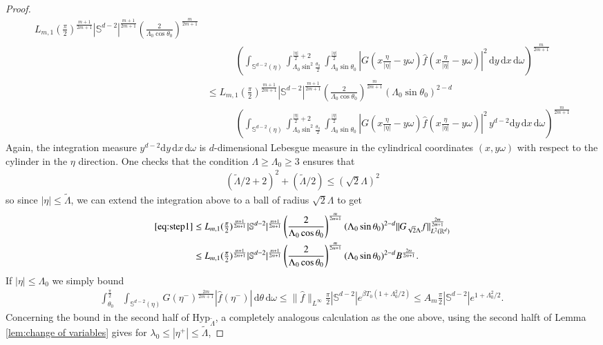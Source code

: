 \documentclass[11pt,a4paper,reqno]{amsart}
\theoremstyle{plain}
\theoremstyle{definition}
\begin{document}
\begin{proof}
\begin{align*}
		L_{m,1} (\tfrac{\pi}{2})^{\frac{m+1}{2m+1}} |{\mathbb{S}}^{d-2}|^{\frac{m+1}{2m+1}}
		\left(\frac{2}{\Lambda_0\cos\theta_0} \right)^{\frac{m}{2m+1}} \\
		 &\qquad\quad
		\left( \int_{{\mathbb{S}}^{d-2}(\eta)} \int_{\Lambda_0\sin^2\tfrac{\theta_0}{2}}^{\tfrac{|\eta|}{2}+2}
		\int_{\Lambda_0\sin\theta_0}^{\tfrac{|\eta|}{2}}
			| G(x\tfrac{\eta}{|\eta|}-y\omega)\hat{f}(x\tfrac{\eta}{|\eta|}-y\omega)|^2\,
		 \mathrm{d}y \, \mathrm{d}x\, \mathrm{d}\omega \right)^{\frac{m}{2m+1}} \\
		 & \le
		L_{m,1} (\tfrac{\pi}{2})^{\frac{m+1}{2m+1}} |{\mathbb{S}}^{d-2}|^{\frac{m+1}{2m+1}}
		\left(\frac{2}{\Lambda_0\cos\theta_0} \right)^{\frac{m}{2m+1}}
		(\Lambda_0\sin\theta_0)^{2-d} \\
		 &\qquad\quad
		\left( \int_{{\mathbb{S}}^{d-2}(\eta)} \int_{\Lambda_0\sin^2\tfrac{\theta_0}{2}}^{\tfrac{|\eta|}{2}+2}
		\int_{\Lambda_0\sin\theta_0}^{\tfrac{|\eta|}{2}}
			| G(x\tfrac{\eta}{|\eta|}-y\omega)\hat{f}(x\tfrac{\eta}{|\eta|}-y\omega)|^2
			\, y^{d-2}\mathrm{d}y\, \mathrm{d}x\, \mathrm{d}\omega \right)^{\frac{m}{2m+1}}
	\end{align*}
	Again, the integration measure $ y^{d-2}\mathrm{d}y\, \mathrm{d}x\, \mathrm{d}\omega$ is $d$-dimensional Lebesgue measure in the cylindrical coordinates  $(x,y\omega)$ with respect to the cylinder in the $\eta$ direction. One checks that the condition $\Lambda\ge\Lambda_0\ge 3$ ensures that
	\begin{align*}
		(\widetilde{\Lambda}/2+2)^2 +(\widetilde{\Lambda}/2) \le (\sqrt{2}\Lambda)^2
	\end{align*}
	so since $|\eta|\leq \widetilde{\Lambda}$, we can extend the integration above to a ball of radius $\sqrt{2}\Lambda$ to get
	\begin{align}
		\eqref{eq:step1}
		&\le
		L_{m,1} (\tfrac{\pi}{2})^{\frac{m+1}{2m+1}} |{\mathbb{S}}^{d-2}|^{\frac{m+1}{2m+1}}
		\left(\frac{2}{\Lambda_0\cos\theta_0} \right)^{\frac{m}{2m+1}}
		(\Lambda_0\sin\theta_0)^{2-d}
			\| G_{\sqrt{2}\Lambda}f \|_{L^2({\mathbb{R}}^d)}^{\frac{2m}{2m+1}} \nonumber\\
		&\le
			 L_{m,1} (\tfrac{\pi}{2})^{\frac{m+1}{2m+1}} |{\mathbb{S}}^{d-2}|^{\frac{m+1}{2m+1}}
		\left(\frac{2}{\Lambda_0\cos\theta_0} \right)^{\frac{m}{2m+1}}
		(\Lambda_0\sin\theta_0)^{2-d} B^{\frac{2m}{2m+1}} .
			\label{eq:step2}
	\end{align}
 If $|\eta|\le \Lambda_0$ we simply bound
 \begin{align}\label{eq:step3}
 	\int_{\theta_0}^{\tfrac{\pi}{2}} &\int_{{\mathbb{S}}^{d-2}(\eta)}  G(\eta^-)^{\frac{2m}{2m+1}} |\hat{f}(\eta^-)| \, \mathrm{d}\theta\, \mathrm{d}\omega
 	\le \|\hat{f}\|_{L^\infty} \frac{\pi}{2} |{\mathbb{S}}^{d-2}| e^{\beta T_0(1+\Lambda_0^2/2)}
 	\le A_m \frac{\pi}{2}|{\mathbb{S}}^{d-2}| e^{1+\Lambda_0^2/2}.
 \end{align}
 Concerning the bound in the second half of $\mathrm{Hyp}_{\widetilde{\Lambda}}$, a completely analogous calculation as the one above, using the second halft of Lemma \ref{lem:change of variables} gives for $\lambda_0\le |\eta^+|\le \widetilde{\Lambda}$,


\end{proof}
\end{document}
